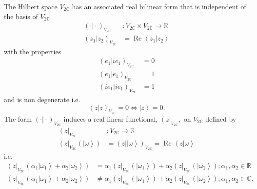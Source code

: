 \documentclass[aps,preprint]{revtex4}%
\begin{document}
The Hilbert space $V_{2\mathbb{C}}$ has an associated real bilinear form that
is independent of the basis of $V_{2\mathbb{C}}$
\begin{align}
\left(  \left.  \cdot\right\vert \cdot\right)  _{V_{2\mathbb{C}}}  &
:V_{2\mathbb{C}}\times V_{2\mathbb{C}}\rightarrow\mathbb{R}\\
\left(  \left.  z_{1}\right\vert z_{2}\right)  _{V_{2\mathbb{C}}}  &
=\operatorname{Re}\left\langle \left.  z_{1}\right\vert z_{2}\right\rangle
\end{align}
with the properties
\begin{align}
\left(  \left.  e_{1}\right\vert ie_{1}\right)  _{V_{2\mathbb{C}}}  &  =0\\
\left(  \left.  e_{1}\right\vert e_{1}\right)  _{V_{2\mathbb{C}}}  &  =1\\
\left(  \left.  ie_{1}\right\vert ie_{1}\right)  _{V_{2\mathbb{C}}}  &  =1
\end{align}
and is non degenerate i.e.
\begin{equation}
\left(  \left.  z\right\vert z\right)  _{V_{2\mathbb{C}}}=0\Leftrightarrow
\left\vert z\right\rangle =0.
\end{equation}
The form $\left(  \left.  \cdot\right\vert \cdot\right)  _{V_{2\mathbb{C}}}$
induces a real linear functional, $\left(  z\right\vert _{V_{2\mathbb{C}}},$
on $V_{2\mathbb{C}}$ defined by
\begin{align}
\left(  z\right\vert _{V_{2\mathbb{C}}}  &  :V_{2\mathbb{C}}\rightarrow
\mathbb{R}\\
\left(  z\right\vert _{V_{2\mathbb{C}}}\left(  \left\vert \omega\right\rangle
\right)   &  =\left(  \left.  z\right\vert \left\vert \omega\right\rangle
\right)  _{V_{2\mathbb{C}}}=\operatorname{Re}\left\langle \left.  z\right\vert
\omega\right\rangle
\end{align}
i.e.
\begin{align}
\left(  z\right\vert _{V_{2\mathbb{C}}}\left(  \alpha_{1}\left\vert \omega
_{1}\right\rangle +\alpha_{2}\left\vert \omega_{2}\right\rangle \right)   &
=\alpha_{1}\left(  z\right\vert _{V_{2\mathbb{C}}}\left(  \left\vert
\omega_{1}\right\rangle \right)  +\alpha_{2}\left(  z\right\vert
_{V_{2\mathbb{C}}}\left(  \left\vert \omega_{2}\right\rangle \right)
;\alpha_{1},\alpha_{2}\in\mathbb{R}\\
\left(  z\right\vert _{V_{2\mathbb{C}}}\left(  \alpha_{1}\left\vert \omega
_{1}\right\rangle +\alpha_{2}\left\vert \omega_{2}\right\rangle \right)   &
\neq\alpha_{1}\left(  z\right\vert _{V_{2\mathbb{C}}}\left(  \left\vert
\omega_{1}\right\rangle \right)  +\alpha_{2}\left(  z\right\vert
_{V_{2\mathbb{C}}}\left(  \left\vert \omega_{2}\right\rangle \right)
;\alpha_{1},\alpha_{2}\in\mathbb{C}.
\end{align}
\end{document}
